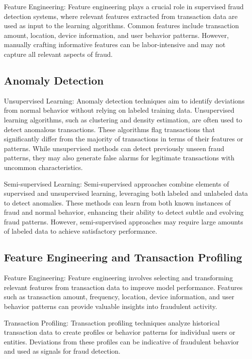 Feature Engineering: Feature engineering plays a crucial role in supervised fraud detection systems, where relevant features extracted from transaction data are used as input to the learning algorithms. Common features include transaction amount, location, device information, and user behavior patterns. However, manually crafting informative features can be labor-intensive and may not capture all relevant aspects of fraud.

\subsection{Anomaly Detection}
\hspace{\parindent}
Unsupervised Learning: Anomaly detection techniques aim to identify deviations from normal behavior without relying on labeled training data. Unsupervised learning algorithms, such as clustering and density estimation, are often used to detect anomalous transactions. These algorithms flag transactions that significantly differ from the majority of transactions in terms of their features or patterns. While unsupervised methods can detect previously unseen fraud patterns, they may also generate false alarms for legitimate transactions with uncommon characteristics.

Semi-supervised Learning: Semi-supervised approaches combine elements of supervised and unsupervised learning, leveraging both labeled and unlabeled data to detect anomalies. These methods can learn from both known instances of fraud and normal behavior, enhancing their ability to detect subtle and evolving fraud patterns. However, semi-supervised approaches may require large amounts of labeled data to achieve satisfactory performance.

\subsection{Feature Engineering and Transaction Profiling}
\hspace{\parindent}
Feature Engineering: Feature engineering involves selecting and transforming relevant features from transaction data to improve model performance. Features such as transaction amount, frequency, location, device information, and user behavior patterns can provide valuable insights into fraudulent activity.

Transaction Profiling: Transaction profiling techniques analyze historical transaction data to create profiles or behavior patterns for individual users or entities. Deviations from these profiles can be indicative of fraudulent behavior and used as signals for fraud detection.

